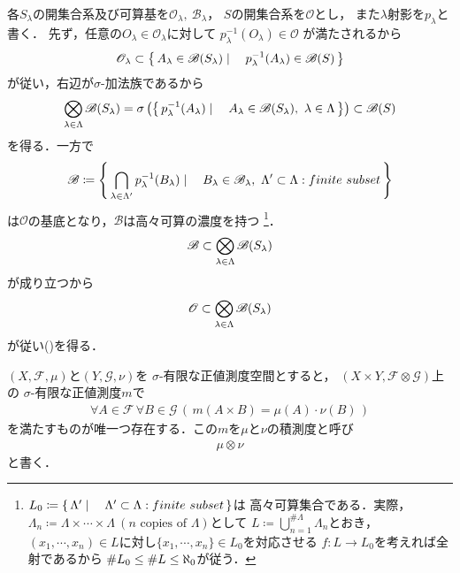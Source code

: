 	
\begin{prf}
	各$S_\lambda$の開集合系及び可算基を$\mathscr{O}_\lambda,\ \mathscr{B}_\lambda$，
	$S$の開集合系を$\mathscr{O}$とし，
	また$\lambda$射影を$p_\lambda$と書く．
	先ず，任意の$O_\lambda \in \mathscr{O}_\lambda$に対して
	$p_\lambda^{-1}(O_\lambda) \in \mathscr{O}$
	が満たされるから
	\begin{align}
		\mathscr{O}_\lambda 
		\subset \left\{\, A_\lambda \in \mathscr{B}(S_\lambda) \mid \quad p_\lambda^{-1}(A_\lambda) \in \mathscr{B}(S)\, \right\}
	\end{align}
	が従い，右辺が$\sigma$-加法族であるから
	\begin{align}
		\bigotimes_{\lambda \in \Lambda} \mathscr{B}(S_\lambda)
		= \sigma \left(\left\{\, p_\lambda^{-1}(A_\lambda) \mid \quad A_\lambda \in \mathscr{B}(S_\lambda),\ \lambda \in \Lambda\, \right\}\right) \subset \mathscr{B}(S)
	\end{align}
	を得る．一方で
	\begin{align}
		\mathscr{B} \coloneqq 
		\left\{\, \bigcap_{\lambda \in \Lambda'} p_\lambda^{-1}(B_\lambda) \mid \quad B_\lambda \in \mathscr{B}_\lambda,\ \Lambda' \subset \Lambda:finite\ subset\, \right\}
	\end{align}
	は$\mathscr{O}$の基底となり，$\mathscr{B}$は高々可算の濃度を持つ
	\footnote{
		$L_0 \coloneqq 
		\Set{\Lambda'}{\Lambda' \subset \Lambda:finite\ subset}$は
		高々可算集合である．実際，$\Lambda_n \coloneqq \Lambda \times \cdots \times \Lambda\ 
		(\mbox{$n$ copies of $\Lambda$})$として
		$L \coloneqq \bigcup_{n=1}^{\# \Lambda} \Lambda_n$とおき，
		$(x_1,\cdots,x_n) \in L$に対し$\{x_1,\cdots,x_n\} \in L_0$を対応させる
		$f:L \longrightarrow L_0$を考えれば全射であるから
		$\# L_0 \leq \# L \leq \aleph_0$が従う．
	}．
	\begin{align}
		\mathscr{B} \subset \bigotimes_{\lambda \in \Lambda} \mathscr{B}(S_\lambda)
	\end{align}
	が成り立つから
	\begin{align}
		\mathscr{O} \subset \bigotimes_{\lambda \in \Lambda} \mathscr{B}(S_\lambda)
	\end{align}
	が従い()を得る．
	\QED
\end{prf}
		
		\begin{screen}
			\begin{thm}[積測度]
				$(X,\mathscr{F},\mu)$と$(Y,\mathscr{G},\nu)$を
				$\sigma$-有限な正値測度空間とすると，
				$\left( X \times Y,\mathscr{F} \otimes \mathscr{G} \right)$上の
				$\sigma$-有限な正値測度$m$で
				\begin{align}
					\forall A \in \mathscr{F}\, \forall B \in \mathscr{G}\,
					\left(\, m(A \times B) = \mu(A) \cdot \nu(B)\, \right)
				\end{align}
				を満たすものが唯一つ存在する．この$m$を$\mu$と$\nu$の積測度と呼び
				\begin{align}
					\mu \otimes \nu
				\end{align}
				と書く．
			\end{thm}
		\end{screen}
		
